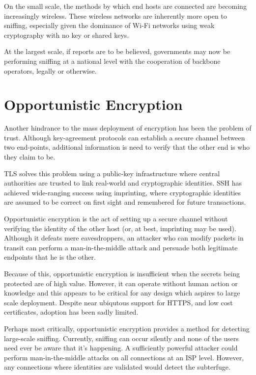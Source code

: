 \documentclass[conference]{IEEEtran}
\begin{document}
On the small scale, the methods by which end hosts are connected are becoming
increasingly wireless. These wireless networks are inherently more open to
sniffing, especially given the dominance of Wi-Fi networks using weak
cryptography\cite{wep} with no key or shared keys.

At the largest scale, if reports are to be believed, governments may now be
performing sniffing at a national level with the cooperation of backbone
operators, legally or otherwise.

\section{Opportunistic Encryption}

Another hindrance to the mass deployment of encryption has been the problem of
trust. Although key-agreement protocols can establish a secure channel between
two end-points, additional information is need to verify that the other end is
who they claim to be.

TLS solves this problem using a public-key infrastructure where central
authorities are trusted to link real-world and cryptographic identities. SSH
has achieved wide-ranging success using imprinting, where cryptographic
identities are assumed to be correct on first sight and remembered for future
transactions.

Opportunistic encryption is the act of setting up a secure channel without
verifying the identity of the other host (or, at best, imprinting may be used).
Although it defeats mere eavesdroppers, an attacker who can modify packets in
transit can perform a man-in-the-middle attack and persuade both legitimate
endpoints that he is the other.

Because of this, opportunistic encryption is insufficient when the secrets
being protected are of high value. However, it can operate without human
action or knowledge and this appears to be critical for any design which
aspires to large scale deployment. Despite near ubiqutous support for HTTPS, and
low cost certificates, adoption has been sadly limited.

Perhaps most critically, opportunistic encryption provides a method for
detecting large-scale sniffing. Currently, sniffing can occur silently and none
of the users need ever be aware that it's happening. A sufficiently
powerful attacker could perform man-in-the-middle attacks on all connections at
an ISP level. However, any connections where identities are validated would
detect the subterfuge.
\end{document}
